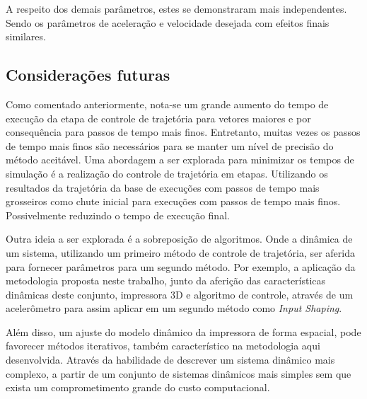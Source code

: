 A respeito dos demais parâmetros, estes se demonstraram mais independentes. Sendo os parâmetros de aceleração e velocidade desejada com efeitos finais similares.

\subsection{Considerações futuras}
Como comentado anteriormente, nota-se um grande aumento do tempo de execução da etapa de controle de trajetória para vetores maiores e por consequência para passos de tempo mais finos. Entretanto, muitas vezes os passos de tempo mais finos são necessários para se manter um nível de precisão do método aceitável. Uma abordagem a ser explorada para minimizar os tempos de simulação é a realização do controle de trajetória em etapas. Utilizando os resultados da trajetória da base de execuções com passos de tempo mais grosseiros como chute inicial para execuções com passos de tempo mais finos. Possivelmente reduzindo o tempo de execução final.

Outra ideia a ser explorada é a sobreposição de algoritmos. Onde
a dinâmica de um sistema, utilizando um primeiro método de controle de trajetória, ser aferida para fornecer parâmetros para um segundo método. Por exemplo, a aplicação da metodologia proposta neste trabalho, junto da aferição das características dinâmicas deste conjunto, impressora 3D e algoritmo de controle, através de um acelerômetro para assim aplicar em um segundo método como \textit{Input Shaping}.

Além disso, um ajuste do modelo dinâmico da impressora de forma espacial, pode favorecer métodos iterativos, também característico na metodologia aqui desenvolvida. Através da habilidade de descrever um sistema dinâmico mais complexo, a partir de um conjunto de sistemas dinâmicos mais simples sem que exista um comprometimento grande do custo computacional.


